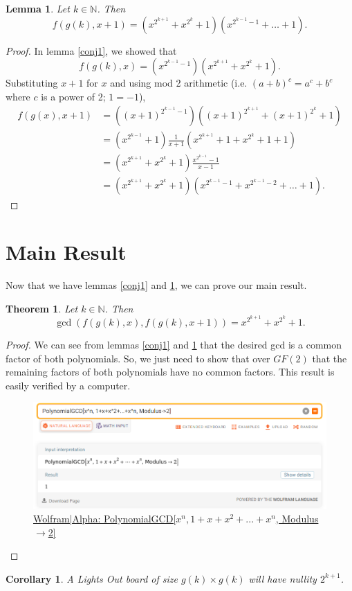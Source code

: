 \documentclass{article}
\newtheorem{lemma}{Lemma}
\newtheorem{theorem}{Theorem}
\newtheorem{corollary}{Corollary}
\newcommand{\N}{\mathbb{N}}
\begin{document}
	\begin{lemma}
		\label{conj2}
		Let $k \in \N$.
		Then
		\begin{equation*}
			f(g(k), x+1) = \left(x^{2^{k+1}}+x^{2^k}+1\right)\left(x^{2^{k-1}-1}+\dots+1\right).
		\end{equation*}
	\end{lemma}
	\begin{proof}
		In lemma \ref{conj1}, we showed that
		\begin{equation*}
			f(g(k),x) = \left(x^{2^{k-1}-1}\right)\left(x^{2^{k+1}} + x^{2^{k}} + 1\right).
		\end{equation*}
		Substituting $x+1$ for $x$ and using mod 2 arithmetic (i.e. $(a+b)^c = a^c + b^c$ where $c$ is a power of 2; $1 = -1$),
		\begin{align*}
			f(g(x), x+1) &= \left((x+1)^{2^{k-1}-1}\right)\left((x+1)^{2^{k+1}} + (x+1)^{2^k} + 1\right) \\
			&= \left(x^{2^{k-1}}+1\right)\frac{1}{x+1}\left(x^{2^{k+1}} + 1 + x^{2^k} + 1 + 1\right) \\
			&= \left(x^{2^{k+1}} + x^{2^k} + 1\right)\frac{x^{2^{k-1}}-1}{x-1} \\
			&= \left(x^{2^{k+1}} + x^{2^k} + 1\right)\left(x^{2^{k-1}-1} + x^{2^{k-1}-2} + \dots + 1\right).
		\end{align*}
	\end{proof}
	
	\section{Main Result}
	Now that we have lemmas \ref{conj1} and \ref{conj2}, we can prove our main result.
	\begin{theorem}
		Let $k \in \N$.
		Then
		\begin{equation*}
			\gcd\left(f(g(k),x),f(g(k),x+1)\right) = x^{2^{k+1}} + x^{2^k} + 1.
		\end{equation*}
	\end{theorem}
	\begin{proof}
		We can see from lemmas 
		\ref{conj1} and \ref{conj2} that the desired gcd is a common factor of both polynomials.
		So, we just need to show that over $GF(2)$ that the remaining factors of both polynomials have no common factors.
		This result is easily verified by a computer.
		
		\begin{figure}[H]
			\centering
			\includegraphics[width=.8\textwidth]{wolfram_result.png}
			\caption{\href{https://www.wolframalpha.com/input/?i=PolynomialGCD\%5Bx\%5En\%2C+1\%2Bx\%2Bx\%5E2\%2B...\%2Bx\%5En\%2C+Modulus-\%3E2\%5D}{Wolfram|Alpha: PolynomialGCD[$x^n, 1+x+x^2+...+x^n$, Modulus$\to$2]}}
		\end{figure}
	\end{proof}

	\begin{corollary}
		A \textit{Lights Out} board of size $g(k) \times g(k)$ will have nullity $2^{k+1}$.
	\end{corollary}
\end{document}
